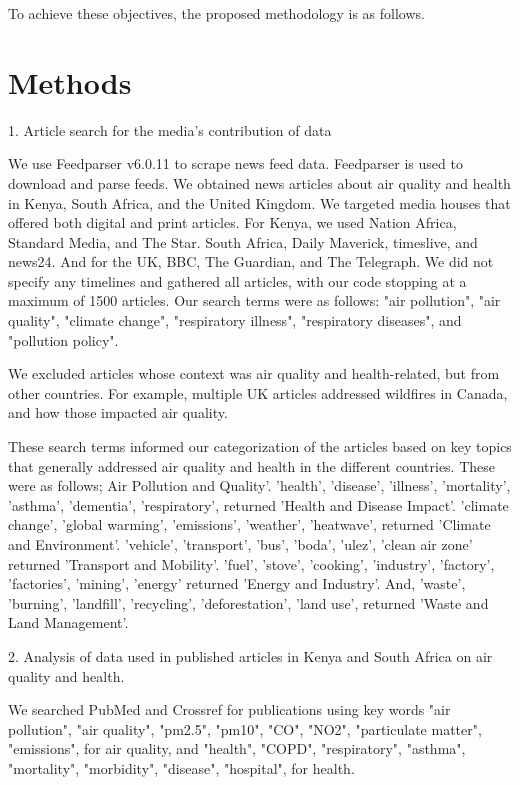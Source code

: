 \documentclass{article}
\begin{document}
To achieve these objectives, the proposed methodology is as follows.

\section{Methods}

1. Article search for the media's contribution of data

We use Feedparser v6.0.11 to scrape news feed data. Feedparser is used to download and parse feeds. We obtained news articles about air quality and health in Kenya, South Africa, and the United Kingdom. We targeted media houses that offered both digital and print articles. For Kenya, we used Nation Africa, Standard Media, and The Star. South Africa, Daily Maverick, timeslive, and news24. And for the UK, BBC, The Guardian, and The Telegraph. We did not specify any timelines and gathered all articles, with our code stopping at a maximum of 1500 articles. Our search terms were as follows: "air pollution", "air quality", "climate change", "respiratory illness", "respiratory diseases", and "pollution policy". 

We excluded articles whose context was air quality and health-related, but from other countries. For example, multiple UK articles addressed wildfires in Canada, and how those impacted air quality. 

These search terms informed our categorization of the articles based on key topics that generally addressed air quality and health in the different countries. These were as follows; Air Pollution and Quality'. 'health', 'disease', 'illness', 'mortality', 'asthma', 'dementia', 'respiratory', returned 'Health and Disease Impact'. 'climate change', 'global warming', 'emissions', 'weather', 'heatwave', returned 'Climate and Environment'. 'vehicle', 'transport', 'bus', 'boda', 'ulez', 'clean air zone' returned 'Transport and Mobility'. 'fuel', 'stove', 'cooking', 'industry', 'factory', 'factories', 'mining', 'energy' returned 'Energy and Industry'. And, 'waste', 'burning', 'landfill', 'recycling', 'deforestation', 'land use', returned 'Waste and Land Management'. 

2. Analysis of data used in published articles in Kenya and South Africa on air quality and health. 

We searched PubMed and Crossref for publications using key words "air pollution", "air quality", "pm2.5", "pm10", "CO", "NO2", "particulate matter", "emissions", for air quality, and "health", "COPD", "respiratory", "asthma", "mortality", "morbidity", "disease", "hospital", for health.
\end{document}
